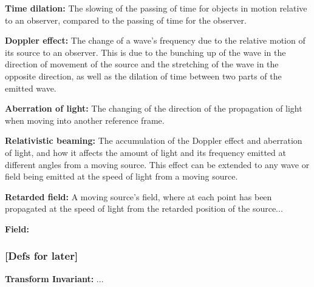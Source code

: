 \noindent \hypertarget{def-time-dilation}{\textbf{Time dilation:}}
The slowing of the passing of time for objects in motion relative to an observer, compared to the passing of time for the observer.

\noindent \hypertarget{def-doppler-effect}{\textbf{Doppler effect:}}
The change of a wave's frequency due to the relative motion of its source to an observer. This is due to the bunching up of the wave in the direction of movement of the source and the stretching of the wave in the opposite direction, as well as the dilation of time between two parts of the emitted wave.

\noindent \hypertarget{def-aberration}{\textbf{Aberration of light:}}
The changing of the direction of the propagation of light when moving into another reference frame.

\noindent \hypertarget{def-relativistic-beaming}{\textbf{Relativistic beaming:}}
The accumulation of the Doppler effect and aberration of light, and how it affects the amount of light and its frequency emitted at different angles from a moving source. This effect can be extended to any wave or field being emitted at the speed of light from a moving source.

\noindent \hypertarget{def-retarded-field}{\textbf{Retarded field:}}
A moving source's field, where at each point has been propagated at the speed of light from the retarded position of the source...

\noindent \hypertarget{def-field}{\textbf{Field:}}


\subsubsection{[Defs for later]}%

\noindent \hypertarget{def-lorentz-invariant}{\textbf{Transform Invariant:}}
...
